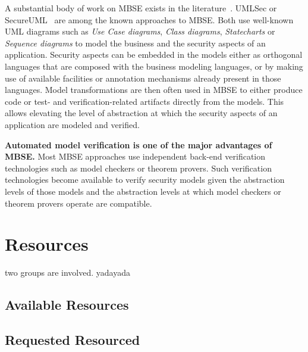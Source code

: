 A substantial body of work on MBSE exists in the literature~\cite{advancesmds}.
UMLSec or SecureUML~\cite{umlsec,secureuml} are among the known approaches
to MBSE. Both use well-known UML diagrams such as \emph{Use Case diagrams},
\emph{Class diagrams}, \emph{Statecharts} or \emph{Sequence diagrams} to model
the business and the security aspects of an application. Security aspects can be embedded in the models either as orthogonal
languages that are composed with the business modeling languages, or by making
use of available facilities or annotation mechanisms already present in those
languages. Model transformations are then often used in MBSE to either produce
code or test- and verification-related artifacts directly from the models. This
allows elevating the level of abstraction at which the security aspects of an
application are modeled and verified.

\textbf{Automated model verification is one of the major advantages of MBSE.}
Most MBSE approaches use independent back-end verification technologies such as
model checkers or theorem provers. Such verification technologies become available to
verify security models given the abstraction levels of those models and the
abstraction levels at which model checkers or theorem provers operate are
compatible.

\section{Resources}

two groups are involved. yadayada 

\subsection{Available Resources}

\subsection{Requested Resourced}

